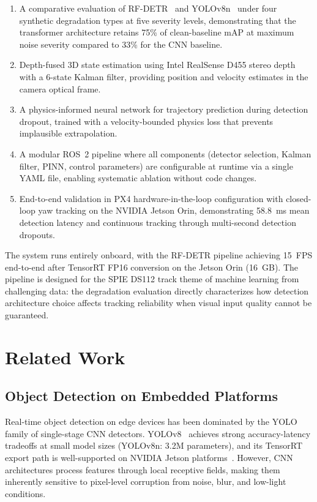\documentclass[11pt,letterpaper]{article}
\begin{document}
\begin{enumerate}
    \item A comparative evaluation of RF-DETR~\cite{rfdetr2025} and YOLOv8n~\cite{ultralytics2023} under four synthetic degradation types at five severity levels, demonstrating that the transformer architecture retains 75\% of clean-baseline mAP at maximum noise severity compared to 33\% for the CNN baseline.
    \item Depth-fused 3D state estimation using Intel RealSense D455 stereo depth with a 6-state Kalman filter, providing position and velocity estimates in the camera optical frame.
    \item A physics-informed neural network for trajectory prediction during detection dropout, trained with a velocity-bounded physics loss that prevents implausible extrapolation.
    \item A modular ROS~2 pipeline where all components (detector selection, Kalman filter, PINN, control parameters) are configurable at runtime via a single YAML file, enabling systematic ablation without code changes.
    \item End-to-end validation in PX4 hardware-in-the-loop configuration with closed-loop yaw tracking on the NVIDIA Jetson Orin, demonstrating 58.8~ms mean detection latency and continuous tracking through multi-second detection dropouts.
\end{enumerate}

The system runs entirely onboard, with the RF-DETR pipeline achieving 15~FPS end-to-end after TensorRT FP16 conversion on the Jetson Orin (16~GB). The pipeline is designed for the SPIE DS112 track theme of machine learning from challenging data: the degradation evaluation directly characterizes how detection architecture choice affects tracking reliability when visual input quality cannot be guaranteed.

\section{Related Work}
\label{sec:related}

\subsection{Object Detection on Embedded Platforms}

Real-time object detection on edge devices has been dominated by the YOLO family of single-stage CNN detectors. YOLOv8~\cite{ultralytics2023} achieves strong accuracy-latency tradeoffs at small model sizes (YOLOv8n: 3.2M parameters), and its TensorRT export path is well-supported on NVIDIA Jetson platforms~\cite{jetsonorin}. However, CNN architectures process features through local receptive fields, making them inherently sensitive to pixel-level corruption from noise, blur, and low-light conditions.
\end{document}
